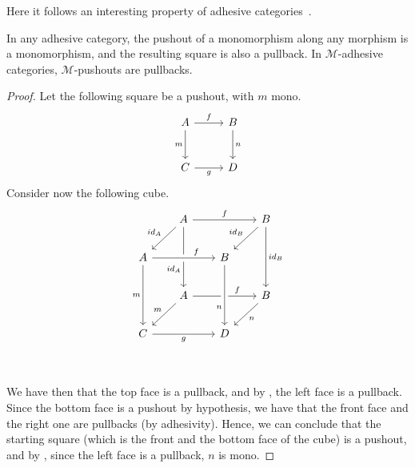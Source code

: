 Here it follows an interesting property of adhesive categories~\cite{lack2011embeddingtheoremadhesivecategories}.

\begin{prop}\label{prop:monos_are_preserved_by_pullbacks_in_adh_cats}
    In any adhesive category, the pushout of a monomorphism along any morphism is a monomorphism, and the resulting square is also a pullback. %
	In $\mathcal{M}$-adhesive categories, $\mathcal{M}$-pushouts are pullbacks.
\end{prop}

\begin{proof}
	Let the following square be a pushout, with $m$ mono.
	\[\begin{tikzcd}[row sep = 26, column sep = 26]
		A \ar[r, "f"] \ar[d, "m"swap] & B \ar[d, "n"] \\
		C \ar[r, "g"swap] & D
	\end{tikzcd}\]
	Consider now the following cube.
	\[\begin{tikzcd}[row sep = 20, column sep = 20]
	& A && B \\
	A && B \\
	& A && B \\
	C && D \\
	& {}
	\arrow["f", from=1-2, to=1-4]
	\arrow["{id_A}"', from=1-2, to=2-1]
	\arrow["{id_A}"'{pos=0.7}, from=1-2, to=3-2]
	\arrow["{id_B}"', from=1-4, to=2-3]
	\arrow["{id_B}", from=1-4, to=3-4]
	\arrow["m"', from=2-1, to=4-1]
	\arrow["f"{pos=0.7}, from=3-2, to=3-4]
	\arrow["m"', from=3-2, to=4-1]
	\arrow["n", from=3-4, to=4-3]
	\arrow["g"', from=4-1, to=4-3]
	\arrow["f"{pos=0.7}, from=2-1, to=2-3, crossing over]
	\arrow["n"'{pos=0.7}, from=2-3, to=4-3, crossing over]
	\end{tikzcd}\]

	We have then that the top face is a pullback, and by , the left face is a pullback. Since the bottom face is a pushout by hypothesis, we have that the front face and the right one are pullbacks (by adhesivity). Hence, we can conclude that the starting square (which is the front and the bottom face of the cube) is a pushout, and by , since the left face is a pullback, $n$ is mono.


\end{proof}
